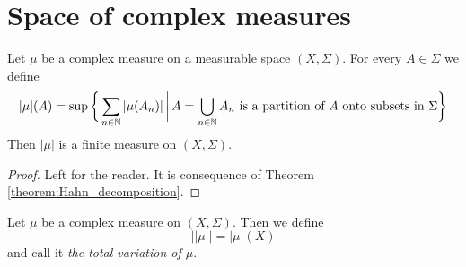 \section{Space of complex measures}

\begin{proposition}\label{proposition:variationismeasure}
    Let $\mu$ be a complex measure on a measurable space $(X,\Sigma)$. For every $A\in \Sigma$ we define
    $$|\mu|(A) = \sup \bigg\{\sum_{n\in {\mathbb N}}|\mu(A_n)|\,\bigg|\,A = \bigcup_{n\in {\mathbb N}}A_n\mbox{ is a partition of }A\mbox{ onto subsets in }\Sigma\bigg\}$$
    Then $|\mu|$ is a finite measure on $(X,\Sigma)$.
\end{proposition}
\begin{proof}
    Left for the reader. It is consequence of Theorem \ref{theorem:Hahn_decomposition}.
\end{proof}

\begin{definition}
    Let $\mu$ be a complex measure on $(X,\Sigma)$. Then we define
    $$||\mu|| = |\mu|(X)$$
    and call it \textit{the total variation of $\mu$}.
\end{definition}

